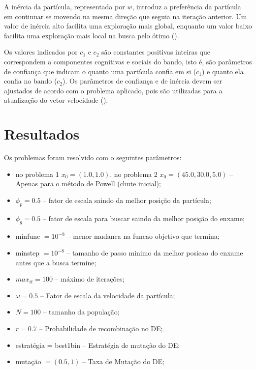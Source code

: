 \documentclass{article}
\begin{document}
A inércia da partícula, representada por $w$, introduz a preferência da partícula em continuar se movendo na mesma direção que seguia na iteração anterior. Um valor de inércia alto facilita uma exploração mais global, enquanto um valor baixo facilita uma exploração mais local na busca pelo ótimo (\cite{miranda2018pyswarms}).\newline

Os valores indicados por $c_1$ e $c_2$ são constantes positivas inteiras que correspondem a componentes cognitivas e sociais do bando, isto é, são parâmetros de confiança que indicam o quanto uma partícula confia em si ($c_1$) e quanto ela confia no bando ($c_2$). Os parâmetros de confiança e de inércia devem ser ajustados de
acordo com o problema aplicado, pois são utilizadas para a atualização do vetor velocidade (\cite{miranda2018pyswarms}).
\section{Resultados}
Os problemas foram resolvido com o seguintes parâmetros:

\begin{itemize}
\item no problema 1 $x_0 = (1.0, 1.0)$, no problema 2 $x_0 = (45.0, 30.0, 5.0)$ -- Apenas para o método de Powell (chute inicial);
\item $\phi_p      = 0.5$       -- fator de escala saindo da melhor posição da partícula;
\item $\phi_g      = 0.5$       -- fator de escala para buscar saindo da melhor posição do enxame;
\item minfunc   $= 10^{-8}$     -- menor mudanca na funcao objetivo que termina;
\item minstep   $= 10^{-8}$     -- tamanho de passo minimo da melhor posicao do enxame antes que a busca termine;
\item ${max}_{it}   = 100$      -- máximo de iterações;
\item $\omega     = 0.5$        -- Fator de escala da velocidade da partícula;
\item $N = 100$                 -- tamanho da população;
\item $r = 0.7$                 -- Probabilidade de recombinação no DE;
\item estratégia = best1bin     -- Estratégia de mutação do DE;
\item mutação   $= (0.5, 1)$  --  Taxa de Mutação do DE;
\end{itemize}
\end{document}
